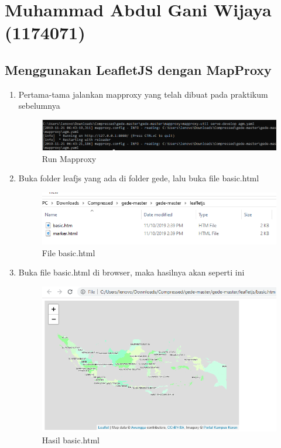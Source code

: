 \section{Muhammad Abdul Gani Wijaya (1174071)}
\subsection{Menggunakan LeafletJS dengan MapProxy}
\begin{enumerate}
	\item Pertama-tama jalankan mapproxy yang telah dibuat pada praktikum sebelumnya
    \hfill\break
    \begin{figure}[H]
		\includegraphics[width=12cm]{figures/Tugas5/1174071/1.png}
		\centering
		\caption{Run Mapproxy}
	\end{figure}
	
	\item Buka folder leafjs yang ada di folder gede, lalu buka file basic.html
    \hfill\break
    \begin{figure}[H]
		\includegraphics[width=12cm]{figures/Tugas5/1174071/2.png}
		\centering
		\caption{File basic.html}
	\end{figure}
	
	\item Buka file basic.html di browser, maka hasilnya akan seperti ini
    \hfill\break
    \begin{figure}[H]
		\includegraphics[width=12cm]{figures/Tugas5/1174071/3.png}
		\centering
		\caption{Hasil basic.html}
	\end{figure}
	

\end{enumerate}
